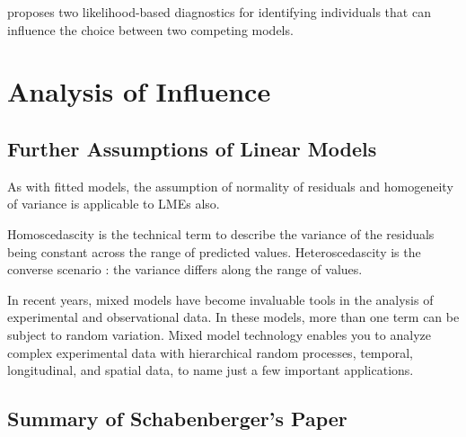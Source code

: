 \documentclass[12pt, a4paper]{article}
\begin{document}
			\citet{Demi} proposes two likelihood-based diagnostics for identifying individuals that can influence the choice between two competing models.
			
			
			
			\section{Analysis of  Influence}
			
			
			
			\subsection{Further Assumptions of Linear Models}
			
			As with fitted models, the assumption of normality of residuals and homogeneity of variance is applicable to LMEs also. 
			
			
			
			Homoscedascity is the technical term to describe the variance of the
			residuals being constant across the range of predicted values.
			Heteroscedascity is the converse scenario : the variance differs along
			the range of values.
			
			
			
			In recent years, mixed models have become invaluable tools in the analysis of experimental and observational
			data. In these models, more than one term can be subject to random variation. Mixed model
			technology enables you to analyze complex experimental data with hierarchical random processes, temporal,
			longitudinal, and spatial data, to name just a few important applications. 
			
			
			\subsection{Summary of Schabenberger's Paper}
			
			
			
\end{document}
